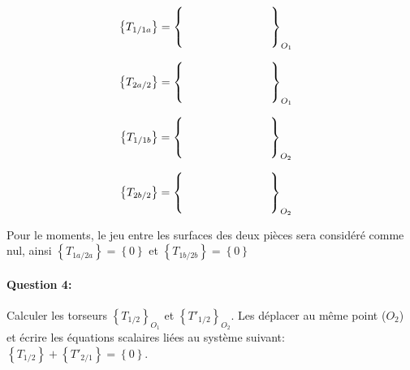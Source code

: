 \begin{minipage}{0.48\linewidth}
\begin{eqnarray}
& \left\{T_{1/1a}\right\}=\left\{\begin{array}{m{2cm} c}
 &  \\
 &  \\
 & 
\end{array}\right\}_{O_{1}}
\end{eqnarray}
\end{minipage}
\hfill
\begin{minipage}{0.48\linewidth}
\begin{eqnarray}
& \left\{T_{2a/2}\right\}=\left\{\begin{array}{m{2cm} c}
 &  \\
 &  \\
 & 
\end{array}\right\}_{O_{1}}
\end{eqnarray}
\end{minipage}

\begin{minipage}{0.48\linewidth}
\begin{eqnarray}
& \left\{T_{1/1b}\right\}=\left\{\begin{array}{m{2cm} c}
 &  \\
 &  \\
 & 
\end{array}\right\}_{O_{2}}
\end{eqnarray}
\end{minipage}
\hfill
\begin{minipage}{0.48\linewidth}
\begin{eqnarray}
& \left\{T_{2b/2}\right\}=\left\{\begin{array}{m{2cm} c}
 &  \\
 &  \\
 & 
\end{array}\right\}_{O_{2}}
\end{eqnarray}
\end{minipage}

Pour le moments, le jeu entre les surfaces des deux pièces sera considéré comme nul, ainsi $\left\{T_{1a/2a}\right\}=\left\{0\right\}$ et $\left\{T_{1b/2b}\right\}=\left\{0\right\}$

\paragraph{Question 4:} Calculer les torseurs $\left\{T_{1/2}\right\}_{O_1}$ et $\left\{T'_{1/2}\right\}_{O_2}$. Les déplacer au même point ($O_2$) et écrire les équations scalaires liées au système suivant: $\left\{T_{1/2}\right\}+\left\{T'_{2/1}\right\}=\left\{0\right\}$.

